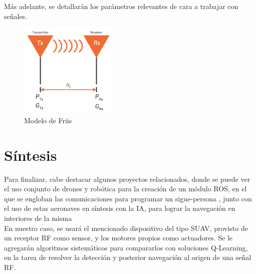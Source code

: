 Más adelante, se detallarán los parámetros relevantes de cara a trabajar con señales.

\begin{figure} [H]
	\begin{center}
	\includegraphics[height=4.5cm]{imagenes/cap1/10_friis.png}
	\end{center}
	\caption[Modelo de Friis]{Modelo de Friis}
	\label{fig:friis}
\end{figure}

\section{Síntesis}
\label{subsec:sintesis}

Para finalizar, cabe destacar algunos proyectos relacionados, donde se puede ver el uso conjunto de drones y robótica para la creación de un módulo ROS, en el que se engloban las comunicaciones para programar un sigue-persona \cite{tfm-pedro}, junto con el uso de estas aeronaves en síntesis con la \ac{IA}, para lograr la navegación en interiores de la misma \cite{paper-ia-dron}\\

En nuestro caso, se usará el mencionado dispositivo del tipo \ac{SUAV}, provisto de un receptor \ac{RF} como sensor, y los motores propios como actuadores. Se le agregarán algoritmos sistemáticos para compararlos con soluciones Q-Learning, en la tarea de resolver la detección y posterior navegación al origen de una señal \ac{RF}.